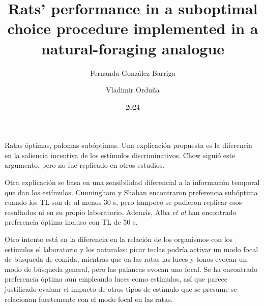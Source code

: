 \documentclass[a4paper,12pt]{article}
\title{Rats' performance in a suboptimal choice procedure implemented in a natural-foraging analogue}
\author{Fernanda González-Barriga \and Vladimir Orduña}
\date{2024}
\begin{document}
{\scshape\bfseries \maketitle}

Ratas óptimas, palomas subóptimas.
Una explicación propuesta es la diferencia en la saliencia incentiva de los estímulos discriminativos.
Chow siguió este argumento, pero no fue replicado en otros estudios.

Otra explicación se basa en una sensibilidad diferencial a la información temporal que dan los estímulos.
Cunningham y Shahan encontraron preferencia subóptima cuando los TL son de al menos 30 s, pero tampoco se pudieron replicar esos resultados ni en su propio laboratorio.
Además, Alba {\itshape et al} han encontrado preferencia óptima incluso con TL de 50 s.

Otro intento está en la diferencia en la relación de los organismos con los estímulos el laboratorio y los naturales: picar teclas podría activar un modo focal de búsqueda de comida, mientras que en las ratas las luces y tonos evocan un modo de búsqueda general, pero las palancas evocan uno focal.
Se ha encontrado preferencia óptima aun empleando luces como estímulos, así que parece justificado evaluar el impacto de otros tipos de estímulo que se presume se relacionan fuertemente con el modo focal en las ratas.
\end{document}
